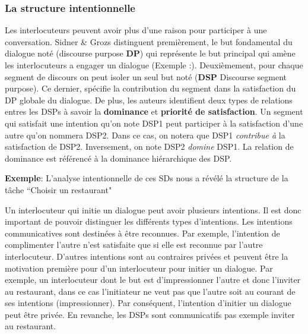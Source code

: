 \documentclass[a4paper,french]{article}
\begin{document}
\subsubsection{La structure intentionnelle} 
Les interlocuteurs peuvent avoir plus d'une raison pour participer à une conversation. Sidner \& Grozs distinguent premièrement, le but fondamental du dialogue noté (discourse purpose \textbf{DP}) qui représente le but principal qui amène les interlocuteurs a engager un dialogue (Exemple :). Deuxièmement, pour chaque segment de discours on peut isoler un seul but noté (\textbf{DSP} Discourse segment purpose). Ce dernier, spécifie la contribution du segment dans la satisfaction du DP globale du dialogue. De plus, les auteurs identifient deux types de relations entres les DSPs à savoir la \textbf{dominance} et \textbf{priorité de satisfaction}. Un segment qui satisfait une intention qu'on note DSP1 peut participer à la satisfaction d'une autre qu'on nommera DSP2. Dans ce cas, on notera que DSP1 \textit{contribue à} la satisfaction de DSP2. Inversement, on note DSP2 \textit{domine} DSP1. La relation de dominance est référencé à la dominance hiérarchique des DSP.

\par \textbf{Exemple}: L'analyse intentionnelle de ces SDs nous a révélé la structure de la tâche ``Choisir un restaurant"

\begin{figure}
	\vskip 8pt
\end{figure}


\par Un interlocuteur qui initie un dialogue peut avoir plusieurs intentions. Il est donc important de pouvoir distinguer les différents types d'intentions. Les intentions communicatives sont destinées à être reconnues. Par exemple, l'intention de complimenter l'autre n'est satisfaite que si elle est reconnue par l'autre interlocuteur. D'autres intentions sont au contraires privées et peuvent être la motivation première pour d'un interlocuteur pour initier un dialogue. Par exemple, un interlocuteur dont le but est d'impressionner l'autre et donc l'inviter au restaurant, dans ce cas l'initiateur ne veut pas que l'autre soit au courant de ses intentions (impressionner). Par conséquent, l'intention d'initier un dialogue peut être privée. En revanche, les DSPs sont communicatifs pas exemple inviter au restaurant. 
\end{document}
